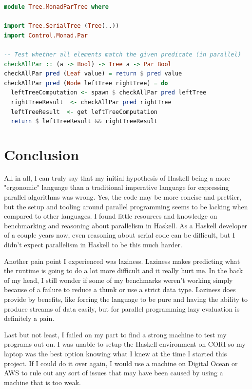 \documentclass[a4paper, 10pt]{article}
\begin{document}
\begin{lstlisting}[language=Haskell, caption=Tree check using monad-par]
module Tree.MonadParTree where

import Tree.SerialTree (Tree(..))
import Control.Monad.Par

-- Test whether all elements match the given predicate (in parallel)
checkAllPar :: (a -> Bool) -> Tree a -> Par Bool
checkAllPar pred (Leaf value) = return $ pred value
checkAllPar pred (Node leftTree rightTree) = do
  leftTreeComputation <- spawn $ checkAllPar pred leftTree
  rightTreeResult  <- checkAllPar pred rightTree
  leftTreeResult  <- get leftTreeComputation
  return $ leftTreeResult && rightTreeResult
\end{lstlisting}

\section{Conclusion}

All in all, I can truly say that my initial hypothesis of Haskell being a more "ergonomic" language than a traditional imperative language for expressing parallel algorithms was wrong. Yes, the code may be more concise and prettier, but the setup and tooling around parallel programming seems to be lacking when compared to other languages. I found little resources and knowledge on benchmarking and reasoning about parallelism in Haskell. As a Haskell developer of a couple years now, even reasoning about serial code can be difficult, but I didn't expect parallelism in Haskell to be this much harder. 

Another pain point I experienced was laziness. Laziness makes predicting what the runtime is going to do a lot more difficult and it really hurt me. In the back of my head, I still wonder if some of my benchmarks weren't working simply because of a failure to reduce a thunk or use a strict data type. Laziness does provide by benefits, like forcing the language to be pure and having the ability to produce streams of data easily, but for parallel programming lazy evaluation is definitely a pain.

Last but not least, I failed on my part to find a strong machine to test my programs out on. I was unable to setup the Haskell environment on CORI so my laptop was the best option knowing what I knew at the time I started this project. If I could do it over again, I would use a machine on Digital Ocean or AWS to rule out any sort of issues that may have been caused by using a machine that is too weak.
\end{document}
